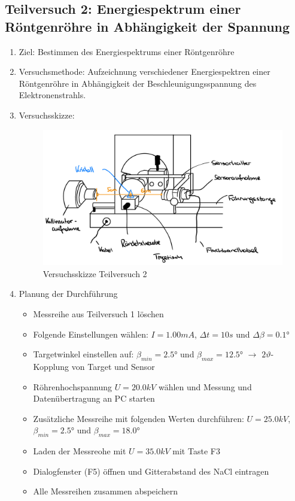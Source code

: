 \documentclass{article}
\begin{document}
\subsection{Teilversuch 2: Energiespektrum einer Röntgenröhre in Abhängigkeit der Spannung}
\begin{enumerate}[label = (\Roman*)]
    \item Ziel: Bestimmen des Energiespektrums einer Röntgenröhre
    
    \item Versuchsmethode: Aufzeichnung verschiedener Energiespektren einer Röntgenröhre in Abhängigkeit der Beschleunigungsspannung des Elektronenstrahls.
    
    \item Versuchsskizze:
    
        \begin{figure}[H]
        \centering
        \includegraphics[width=0.7\linewidth]{Abbildungen/Aufbau Bragg Versuche.jpeg}
        \caption{Versuchsskizze Teilversuch 2}
        \end{figure}

    \item Planung der Durchführung
        \begin{itemize}
           \item Messreihe aus Teilversuch 1 löschen
           \item Folgende Einstellungen wählen: $I=1.00mA$, $\Delta t=10s$ und $\Delta\beta=0.1°$
           \item Targetwinkel einstellen auf: $\beta_{min}=2.5°$ und $\beta_{max}=12.5°$ $\to$ $2\vartheta$-Kopplung von Target und Sensor
           \item Röhrenhochspannung $U=20.0kV$ wählen und Messung und Datenübertragung an PC starten
           \item Zusätzliche Messreihe mit folgenden Werten durchführen: $U=25.0kV$, $\beta_{min}=2.5°$ und $\beta_{max}=18.0°$
           \item Laden der Messreohe mit $U=35.0kV$ mit Taste F3
           \item Dialogfenster (F5) öffnen und Gitterabstand des NaCl eintragen
           \item Alle Messreihen zusammen abspeichern
        \end{itemize}


\end{enumerate}
\end{document}

